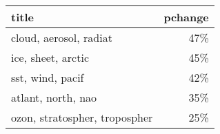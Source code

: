 \begin{tabular}{p{1.2cm}r}
\toprule
                         title &  pchange \\
\midrule
        cloud, aerosol, radiat &      47\% \\
            ice, sheet, arctic &      45\% \\
              sst, wind, pacif &      42\% \\
            atlant, north, nao &      35\% \\
 ozon, stratospher, tropospher &      25\% \\
\bottomrule
\end{tabular}
